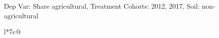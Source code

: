 \begin{table}[H]
\captionlistentry[table]{}
\label{table:beaver_land_class_DVis_land_class_1_SCg12_SSNAG}
\scriptsize %
Dep Var: Share agricultural, Treatment Cohorts: 2012, 2017, Soil: non-agricultural \\
\begin{threeparttable}
\begin{tabulary}{\textwidth}{l*{7}{c}@{}}
\toprule \toprule
\noalign{\smallskip}
\noalign{\smallskip}
\midrule \bottomrule
\end{tabulary}
\medskip
\end{threeparttable}
\end{table}
